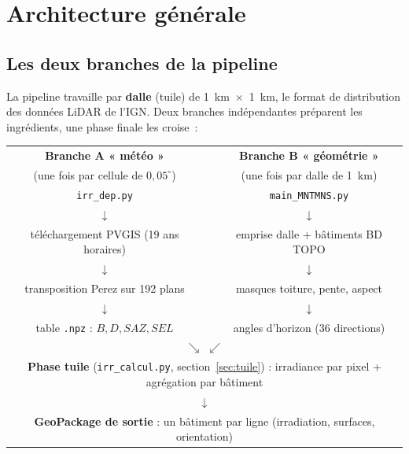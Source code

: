 \documentclass[11pt,a4paper]{article}
\newcommand{\fichier}[1]{\texttt{#1}}
\begin{document}
\section{Architecture générale}

\subsection{Les deux branches de la pipeline}

La pipeline travaille par \textbf{dalle} (tuile) de 1~km~$\times$~1~km, le
format de distribution des données LiDAR de l'IGN. Deux branches indépendantes
préparent les ingrédients, une phase finale les croise~:

\begin{center}
\begin{tabular}{ccc}
\textbf{Branche A « météo »} & & \textbf{Branche B « géométrie »}\\
(une fois par cellule de $0{,}05^\circ$) & & (une fois par dalle de 1~km)\\[2pt]
\fichier{irr\_dep.py} & & \fichier{main\_MNTMNS.py}\\
$\downarrow$ & & $\downarrow$\\
téléchargement PVGIS (19 ans horaires) & & emprise dalle + bâtiments BD TOPO\\
$\downarrow$ & & $\downarrow$\\
transposition Perez sur 192 plans & & masques toiture, pente, aspect\\
$\downarrow$ & & $\downarrow$\\
table \fichier{.npz} : $B, D, SAZ, SEL$ & & angles d'horizon (36 directions)\\[6pt]
\multicolumn{3}{c}{$\searrow$ \hspace{2cm} $\swarrow$}\\[2pt]
\multicolumn{3}{c}{\textbf{Phase tuile} (\fichier{irr\_calcul.py}, section~\ref{sec:tuile}) : irradiance par pixel + agrégation par bâtiment}\\
\multicolumn{3}{c}{$\downarrow$}\\
\multicolumn{3}{c}{\textbf{GeoPackage de sortie} : un bâtiment par ligne (irradiation, surfaces, orientation)}\\
\end{tabular}
\end{center}
\end{document}
